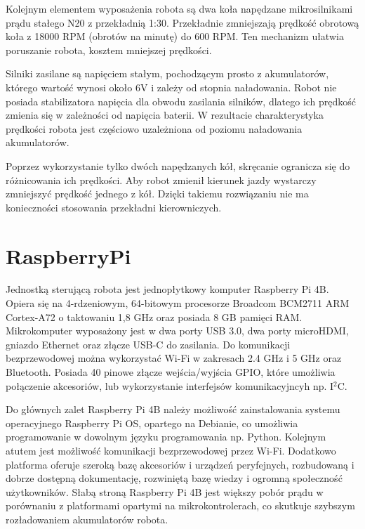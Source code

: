 Kolejnym elementem wyposażenia robota są dwa koła napędzane mikrosilnikami prądu stałego N20 z przekładnią 1:30. Przekładnie zmniejszają prędkość obrotową koła z 18000 RPM (obrotów na minutę) do 600 RPM. Ten mechanizm ułatwia poruszanie robota, kosztem mniejszej prędkości. 

Silniki zasilane są napięciem stałym, pochodzącym prosto z akumulatorów, którego wartość wynosi około 6V i zależy od stopnia naładowania. Robot nie posiada stabilizatora napięcia dla obwodu zasilania silników, dlatego ich prędkość zmienia się w zależności od napięcia baterii. W rezultacie charakterystyka prędkości robota jest częściowo uzależniona od poziomu naładowania akumulatorów.

Poprzez wykorzystanie tylko dwóch napędzanych kół, skręcanie ogranicza się do różnicowania ich prędkości. Aby robot zmienił kierunek jazdy wystarczy zmniejszyć prędkość jednego z kół. Dzięki takiemu rozwiązaniu nie ma konieczności stosowania przekładni kierowniczych.


\section{RaspberryPi}
\label{sec:raspberryPi}

Jednostką sterującą robota jest jednopłytkowy komputer Raspberry Pi 4B. Opiera się na 4-rdzeniowym, 64-bitowym procesorze Broadcom BCM2711 ARM Cortex-A72 o taktowaniu 1,8 GHz oraz posiada 8 GB pamięci RAM. Mikrokomputer wyposażony jest w dwa porty USB 3.0, dwa porty microHDMI, gniazdo Ethernet oraz złącze USB-C do zasilania. Do komunikacji bezprzewodowej można wykorzystać Wi-Fi w zakresach 2.4 GHz i 5 GHz oraz Bluetooth. Posiada 40 pinowe złącze wejścia/wyjścia GPIO, które umożliwia połączenie akcesoriów, lub wykorzystanie interfejsów komunikacyjncyh np. I$^2$C.

Do głównych zalet Raspberry Pi 4B należy możliwość zainstalowania systemu operacyjnego Raspberry Pi OS, opartego na Debianie, co umożliwia programowanie w dowolnym języku programowania np. Python. Kolejnym atutem jest możliwość komunikacji bezprzewodowej przez Wi-Fi. Dodatkowo platforma oferuje szeroką bazę akcesoriów i urządzeń peryfejnych, rozbudowaną i dobrze dostępną dokumentację, rozwiniętą bazę wiedzy i ogromną społeczność użytkowników. Słabą stroną Raspberry Pi 4B jest większy pobór prądu w porównaniu z platformami opartymi na mikrokontrolerach, co skutkuje szybszym rozładowaniem akumulatorów robota.

